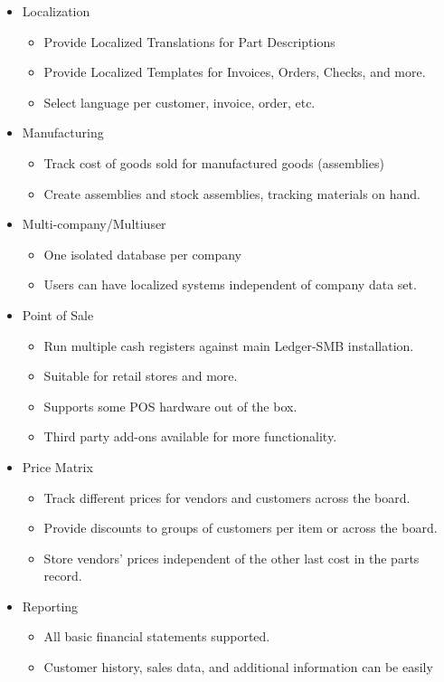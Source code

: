 \documentclass{article}
\begin{document}
\begin{itemize}
\item Localization
  \begin{itemize}
  \item Provide Localized Translations for Part Descriptions
  \item Provide Localized Templates for Invoices, Orders, Checks, and more.
  \item Select language per customer, invoice, order, etc.
  \end{itemize}
\item Manufacturing
  \begin{itemize}
  \item Track cost of goods sold for manufactured goods (assemblies)
  \item Create assemblies and stock assemblies, tracking materials on hand.
  \end{itemize}
\item Multi-company/Multiuser
  \begin{itemize}
  \item One isolated database per company
  \item Users can have localized systems independent of company data set.
  \end{itemize}
\item Point of Sale
  \begin{itemize}
  \item Run multiple cash registers against main Ledger-SMB installation.
  \item Suitable for retail stores and more.
  \item Supports some POS hardware out of the box.
  \item Third party add-ons available for more functionality.
  \end{itemize}
\item Price Matrix
  \begin{itemize}
  \item Track different prices for vendors and customers across the board.
  \item Provide discounts to groups of customers per item or across the board.
  \item Store vendors' prices independent of the other last cost in the
	parts record.
  \end{itemize}
\item Reporting
  \begin{itemize}
  \item All basic financial statements supported.
  \item Customer history, sales data, and additional information can be easily

\end{itemize}
\end{itemize}
\end{document}
